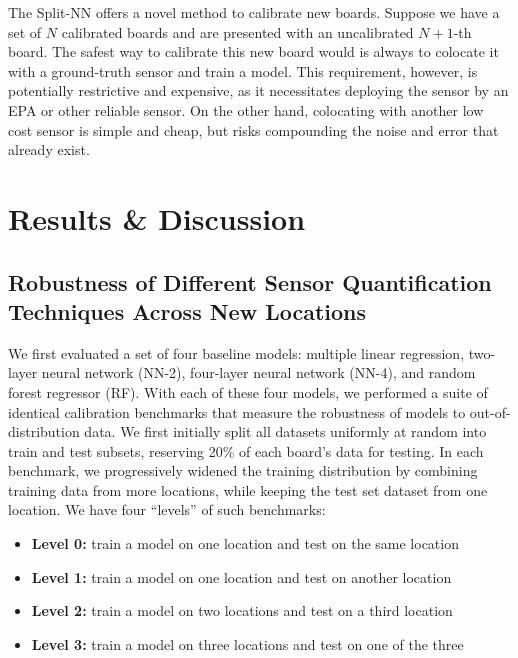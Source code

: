 \documentclass[journal abbreviation, manuscript]{copernicus}
\begin{document}
The Split-NN offers a novel method to calibrate new boards.
Suppose we have a set of $N$ calibrated boards and are presented with an uncalibrated $N + 1$-th board. The safest way to calibrate this new board would is always to colocate it with a ground-truth sensor and train a model. 
This requirement, however, is potentially restrictive and expensive, as it
necessitates deploying the sensor by an EPA or other reliable sensor.
On the other hand, colocating with another low cost sensor is simple
and cheap, but risks
compounding the noise and error that already exist.

\section{Results \& Discussion}

\subsection{Robustness of Different Sensor Quantification Techniques Across New Locations}
We first evaluated a set of four baseline models: multiple linear regression, two-layer neural network (NN-2), four-layer neural network (NN-4), and random forest regressor (RF). With each of these four models, we performed a suite of identical calibration benchmarks that measure the robustness of models to out-of-distribution data. We first initially split all datasets uniformly at random into train and test subsets, reserving 20\% of each board's data for testing.
In each benchmark, we progressively widened the training distribution by combining training data from more locations, while keeping the test set dataset from one location. We have four ``levels'' of such benchmarks:
\begin{itemize}
    \item \textbf{Level 0:} train a model on one location and test on the same location
    \item \textbf{Level 1:} train a model on one location and test on another location
    \item \textbf{Level 2:} train a model on two locations and test on a third location 
    \item \textbf{Level 3:} train a model on three locations and test on one of the three
\end{itemize}
\end{document}
